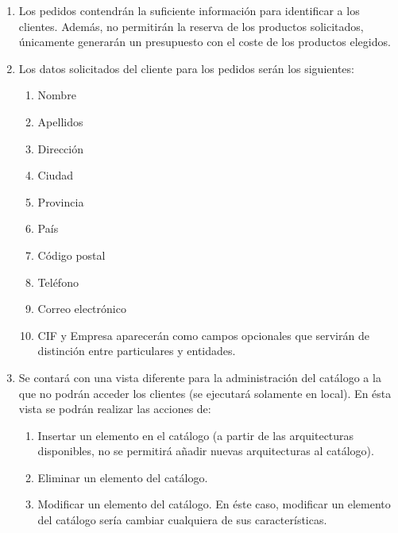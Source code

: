 \documentclass[10pt,a4paper]{article}
\begin{document}
\begin{enumerate}
\item Los pedidos contendrán la suficiente información para identificar a los clientes. Además, no permitirán la reserva de los productos solicitados, únicamente generarán un presupuesto con el coste de los productos elegidos.

\item Los datos solicitados del cliente para los pedidos serán los siguientes:

	\begin{enumerate}
		\item Nombre 
		\item Apellidos
	    \item Dirección
	    \item Ciudad
	    \item Provincia
	    \item País
	    \item Código postal
	    \item Teléfono
	    \item Correo electrónico
	    \item CIF y Empresa aparecerán como campos opcionales que servirán de distinción entre particulares y entidades.
	\end{enumerate}
	

\item Se contará con una vista diferente para la administración del catálogo a la que no podrán acceder los clientes (se ejecutará solamente en local). 
En ésta vista se podrán realizar las acciones de:
	
	\begin{enumerate}
    	\item Insertar un elemento en el catálogo (a partir de las
           arquitecturas disponibles, no se permitirá añadir nuevas
           arquitecturas al catálogo).  
		\item Eliminar un elemento del catálogo.
        \item Modificar un elemento del catálogo. En éste caso, modificar un elemento del catálogo sería cambiar cualquiera de sus características.
    \end{enumerate}   

\end{enumerate}
\end{document}
